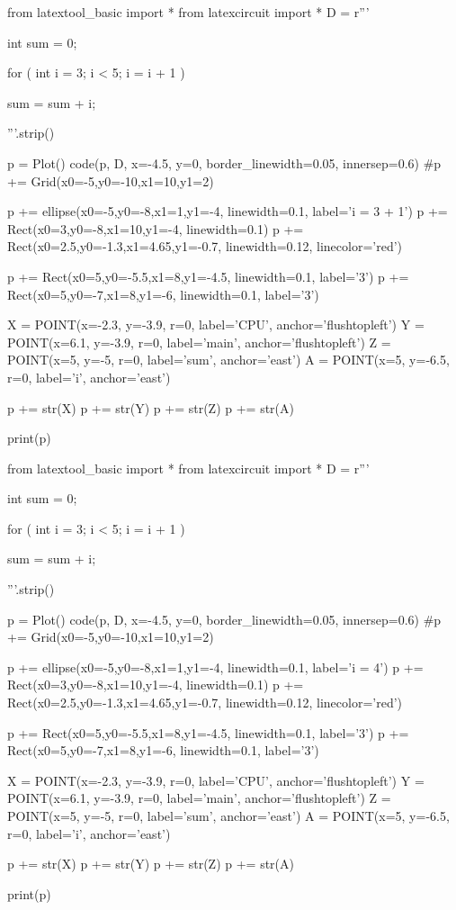 \begin{python}
from latextool_basic import *
from latexcircuit import *
D = r'''



int sum = 0;

    for ( int i = 3;     i < 5;     i = i + 1 )


        sum = sum + i;



'''.strip()

p = Plot()
code(p, D, x=-4.5, y=0, border_linewidth=0.05, innersep=0.6)
#p += Grid(x0=-5,y0=-10,x1=10,y1=2)

p += ellipse(x0=-5,y0=-8,x1=1,y1=-4, linewidth=0.1, label='i = 3 + 1')
p += Rect(x0=3,y0=-8,x1=10,y1=-4, linewidth=0.1)
p += Rect(x0=2.5,y0=-1.3,x1=4.65,y1=-0.7, linewidth=0.12, linecolor='red')

p += Rect(x0=5,y0=-5.5,x1=8,y1=-4.5, linewidth=0.1, label='3')
p += Rect(x0=5,y0=-7,x1=8,y1=-6, linewidth=0.1, label='3')

X = POINT(x=-2.3, y=-3.9, r=0, label='CPU', anchor='flushtopleft')
Y = POINT(x=6.1, y=-3.9, r=0, label='main', anchor='flushtopleft')
Z = POINT(x=5, y=-5, r=0, label='sum', anchor='east')
A = POINT(x=5, y=-6.5, r=0, label='i', anchor='east')

p += str(X)
p += str(Y)
p += str(Z)
p += str(A)

print(p)
\end{python}

\begin{python}
from latextool_basic import *
from latexcircuit import *
D = r'''



int sum = 0;

    for ( int i = 3;     i < 5;     i = i + 1 )


        sum = sum + i;



'''.strip()

p = Plot()
code(p, D, x=-4.5, y=0, border_linewidth=0.05, innersep=0.6)
#p += Grid(x0=-5,y0=-10,x1=10,y1=2)

p += ellipse(x0=-5,y0=-8,x1=1,y1=-4, linewidth=0.1, label='i = 4')
p += Rect(x0=3,y0=-8,x1=10,y1=-4, linewidth=0.1)
p += Rect(x0=2.5,y0=-1.3,x1=4.65,y1=-0.7, linewidth=0.12, linecolor='red')

p += Rect(x0=5,y0=-5.5,x1=8,y1=-4.5, linewidth=0.1, label='3')
p += Rect(x0=5,y0=-7,x1=8,y1=-6, linewidth=0.1, label='3')

X = POINT(x=-2.3, y=-3.9, r=0, label='CPU', anchor='flushtopleft')
Y = POINT(x=6.1, y=-3.9, r=0, label='main', anchor='flushtopleft')
Z = POINT(x=5, y=-5, r=0, label='sum', anchor='east')
A = POINT(x=5, y=-6.5, r=0, label='i', anchor='east')

p += str(X)
p += str(Y)
p += str(Z)
p += str(A)

print(p)
\end{python}

